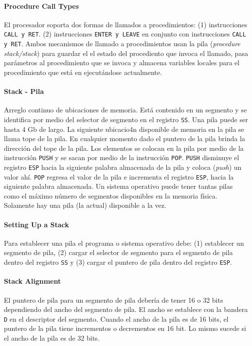\paragraph{\textnormal{\textbf{Procedure Call Types}}}
El procesador soporta dos formas de llamados a procedimientos: (1) instrucciones \texttt{CALL \textnormal{y} RET}. (2) instrucciones \texttt{ENTER \textnormal{y} LEAVE} en conjunto con instrucciones \texttt{CALL \textnormal{y} RET}. 
Ambos mecanismos de llamado a procedimientos usan la pila (\textit{procedure stack/stack}) para guardar el el estado del procediento que invoca el llamado, pasa parámetros al procedimiento que se invoca y almacena variables locales para el procedimiento que está en ejecutándose actualmente.

\paragraph{\textnormal{\textbf{Stack - Pila}}}
Arreglo continuo de ubicaciones de memoria. Está contenido en un segmento y se identifica por medio del selector de segmento en el registro \texttt{SS}. Una pila puede ser hasta 4 Gb de largo. La siguiente ubicacio4n disponible de memoria en la pila se llama tope de la pila. En cualquier momento dado el puntero de la pila brinda la dirección del tope de la pila. Los elementos se colocan en la pila por medio de la instrucción \texttt{PUSH} y se sacan por medio de la instrucción \texttt{POP}. \texttt{PUSH} disminuye el registro \texttt{ESP} hacia la siguiente palabra almacenada de la pila y coloca (\textit{push}) un valor ahí. \texttt{POP} regresa el valor de la pila e incrementa el registro \texttt{ESP}, hacia la siguiente palabra almacenada. Un sistema operativo puede tener tantas pilas como el máximo número de segmentos disponibles en la memoria física. Solamente hay una pila (la actual) disponible a la vez.

\paragraph{Setting Up a Stack}
Para establecer una pila el programa o sistema operativo debe: (1) establecer un segmento de pila, (2) cargar el selector de segmento para el segmento de pila dentro del registro \texttt{SS} y (3) cargar el puntero de pila dentro del registro \texttt{ESP}.

\paragraph{Stack Alignment}
El puntero de pila para un segmento de pila debería de tener 16 o 32 bits dependiendo del ancho del segmento de pila. El ancho se establece con la bandera \texttt{D} en el descriptor del segmento. Cuando el ancho de la pila es de 16 bits, el puntero de la pila tiene incrementos o decrementos en 16 bit. Lo mismo sucede si el ancho de la pila es de 32 bits.

